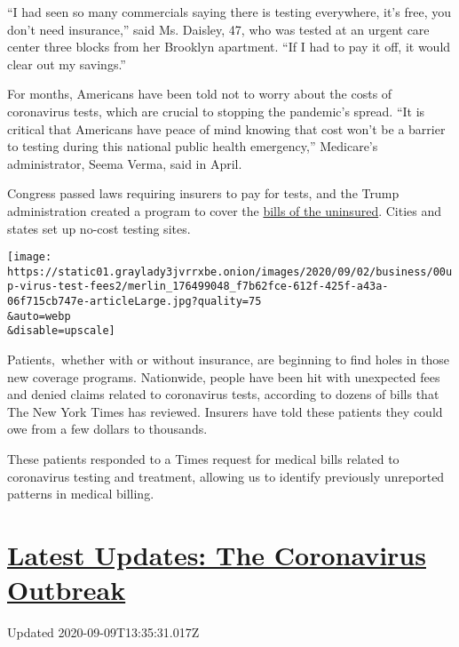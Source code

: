 ``I had seen so many commercials saying there is testing everywhere,
it's free, you don't need insurance,'' said Ms. Daisley, 47, who was
tested at an urgent care center three blocks from her Brooklyn
apartment. ``If I had to pay it off, it would clear out my savings.''

For months, Americans have been told not to worry about the costs of
coronavirus tests, which are crucial to stopping the pandemic's spread.
``It is critical that Americans have peace of mind knowing that cost
won't be a barrier to testing during this national public health
emergency,'' Medicare's administrator, Seema Verma, said in April.

Congress passed laws requiring insurers to pay for tests, and the Trump
administration created a program to cover the
\href{https://www.nytimes3xbfgragh.onion/2020/08/29/health/Covid-obamacare-uninsured.html}{bills
of the uninsured}. Cities and states set up no-cost testing sites.

\texttt{[image: https://static01.graylady3jvrrxbe.onion/images/2020/09/02/business/00up-virus-test-fees2/merlin\_176499048\_f7b62fce-612f-425f-a43a-06f715cb747e-articleLarge.jpg?quality=75\\\&auto=webp\\\&disable=upscale]}

Patients,~whether with or without insurance, are beginning to find holes
in those new coverage programs. Nationwide, people have been hit with
unexpected fees and denied claims related to coronavirus tests,
according to dozens of bills that The New York Times has reviewed.
Insurers have told these patients they could owe from a few dollars to
thousands.

These patients responded to a Times request for medical bills related to
coronavirus testing and treatment, allowing us to identify previously
unreported patterns in medical billing.

\hypertarget{latest-updates-the-coronavirus-outbreak}{%
\section{\texorpdfstring{\href{https://www.nytimes3xbfgragh.onion/2020/09/09/world/covid-19-coronavirus.html?action=click\&pgtype=Article\&state=default\&region=MAIN_CONTENT_1\&context=storylines_live_updates}{Latest
Updates: The Coronavirus
Outbreak}}{Latest Updates: The Coronavirus Outbreak}}\label{latest-updates-the-coronavirus-outbreak}}

Updated 2020-09-09T13:35:31.017Z

